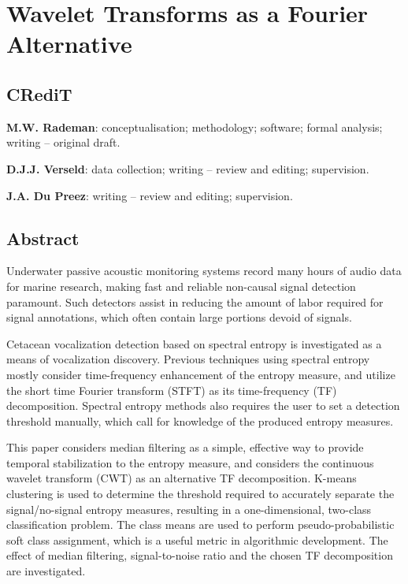 \chapter{Wavelet Transforms as a Fourier Alternative}
\label{chap:p1}



\section*{CRediT}
\textbf{M.W. Rademan}: conceptualisation; methodology; software; formal analysis; writing -- original draft.

\textbf{D.J.J. Verseld}: data collection; writing -- review and editing; supervision.

\textbf{J.A. Du Preez}: writing -- review and editing; supervision.

\section*{Abstract}
Underwater passive acoustic monitoring systems record many hours of audio data for marine research, 
making fast and reliable non-causal signal detection paramount. Such detectors assist in reducing the amount of labor required for signal annotations, which often contain large portions devoid of signals.

Cetacean vocalization detection based on spectral entropy is investigated as a means of vocalization discovery. Previous techniques using spectral entropy mostly consider time-frequency enhancement of the entropy measure, and utilize the short time Fourier transform (STFT) as its time-frequency (TF) decomposition. Spectral entropy methods also requires the user to set a detection threshold manually, which call for knowledge of the produced entropy measures.

This paper considers median filtering as a simple, effective way to provide temporal stabilization to the entropy measure, and considers the continuous wavelet transform (CWT) as an alternative TF decomposition. K-means clustering is used to determine the threshold required to accurately separate the signal/no-signal entropy measures, resulting in a  one-dimensional, two-class classification problem. The class means are used to perform pseudo-probabilistic soft class assignment, which is a useful metric in algorithmic development. The effect of median filtering, signal-to-noise ratio and the chosen TF decomposition are investigated.

